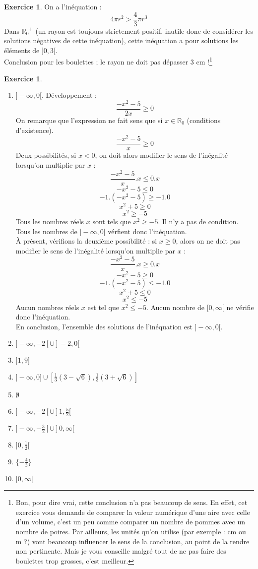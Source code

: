 \documentclass[a4paper,13pt]{scrreprt}
\theoremstyle{plain}
\theoremstyle{definition}
\newtheorem{exo}[subsection]{Exercice}
\newcommand{\rr}{\mathbb{R}}
\begin{document}
\begin{exo} On a l'inéquation :
	$$4\pi r^2 > \frac{4}{3} \pi r^3$$
	Dans ${{\rr}_{0}}^{+}$ (un rayon est toujours strictement positif, inutile donc de considérer les solutions négatives de cette inéquation), cette inéquation a pour solutions les éléments de $]0, 3[$. \\
	Conclusion pour les boulettes ; le rayon ne doit pas dépasser $3$ cm !\footnote{Bon, pour dire vrai, cette conclusion n'a pas beaucoup de sens. En effet, cet exercice vous demande de comparer la valeur numérique d'une aire avec celle d'un volume, c'est un peu comme comparer un nombre de pommes avec un nombre de poires. Par ailleurs, les unités qu'on utilise (par exemple : cm ou m ?) vont beaucoup influencer le sens de la conclusion, au point de la rendre non pertinente. Mais je vous conseille malgré tout de ne pas faire des boulettes trop grosses, c'est meilleur.}
\end{exo}

\begin{exo} ~~\\
	\begin{enumerate}
		\item $]-\infty, 0[$. Développement :
		$$\frac{-x^2-5}{2x} \ge 0$$
		On remarque que l'expression ne fait sens que si $x \in {\rr}_{0}$ (conditions d'existence).
		$$\frac{-x^2-5}{x} \ge 0$$
		Deux possibilités, si $x < 0$, on doit alors modifier le sens de l'inégalité lorsqu'on multiplie par $x$ :
		$$\frac{-x^2-5}{x}.x \le 0.x$$
		$$-x^2-5 \le 0$$
		$$-1.(-x^2-5) \ge -1.0$$
		$$x^2+5 \ge 0$$
		$$x^2 \ge -5$$
		Tous les nombres réels $x$ sont tels que $x^2 \ge -5$. Il n'y a pas de condition. Tous les nombres de $]-\infty, 0[$ vérfient donc l'inéquation. \\
		À présent, vérifions la deuxième possibilité : si $x \ge 0$, alors on ne doit pas modifier le sens de l'inégalité lorsqu'on multiplie par $x$ :
		$$\frac{-x^2-5}{x}.x \ge 0.x$$
		$$-x^2-5 \ge 0$$
		$$-1.(-x^2-5) \le -1.0$$
		$$x^2+5 \le 0$$
		$$x^2 \le -5$$
		Aucun nombres réels $x$ est tel que $x^2 \le -5$. Aucun nombre de $[0,\infty[$ ne vérifie donc l'inéquation. \\
		En conclusion, l'ensemble des solutions de l'inéquation est $]-\infty, 0[$. 
		\item $]-\infty,-2[ \cup ]-2, 0[$
		\item $]1, 9]$
		\item $]-\infty, 0] \cup [\frac{1}{3} (3 - \sqrt{6}), \frac{1}{3} (3 + \sqrt{6})]$
		\item $\emptyset$
		\item $]-\infty, -2[ \cup ]1, \frac{5}{2}[$
		\item $]-\infty, -\frac{3}{2}[ \cup ]0, \infty[$
		\item $]0,\frac{1}{2}[$
		\item $\{ -\frac{4}{3} \}$
		\item $[0,\infty[$
	\end{enumerate}
\end{exo}
\end{document}
